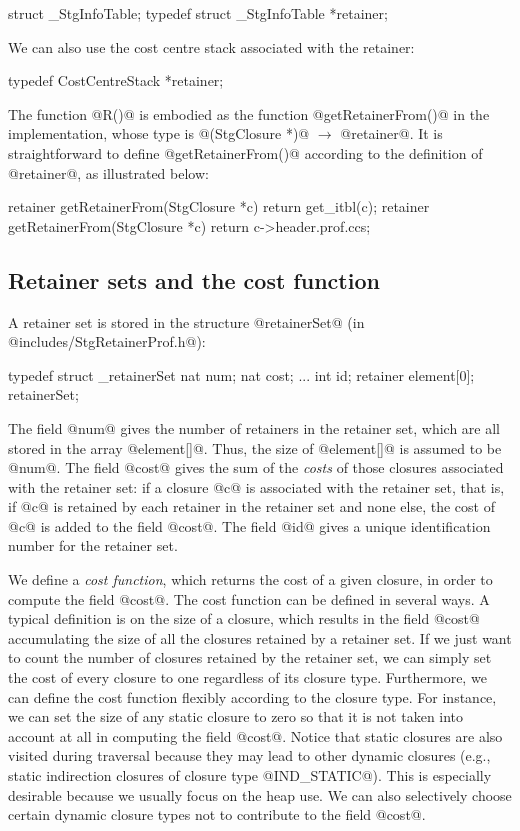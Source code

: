 \documentclass{article}
\begin{document}
\begin{code}
struct _StgInfoTable;
typedef struct _StgInfoTable *retainer;
\end{code}

We can also use the cost centre stack associated with the retainer:

\begin{code}
typedef CostCentreStack *retainer;
\end{code}

The function @R()@ is embodied as the function @getRetainerFrom()@ in the 
implementation, whose type is @(StgClosure *)@ $\rightarrow$ @retainer@.
It is straightforward to define @getRetainerFrom()@ according to the definition
of @retainer@, as illustrated below:

\begin{code}
retainer getRetainerFrom(StgClosure *c) { return get_itbl(c); }
retainer getRetainerFrom(StgClosure *c) { return c->header.prof.ccs; }
\end{code}

\subsection{Retainer sets and the cost function}

A retainer set is stored in the structure @retainerSet@ 
(in @includes/StgRetainerProf.h@):

\begin{code}
typedef struct _retainerSet {
  nat num;
  nat cost;
  ...
  int id;
  retainer element[0];
} retainerSet;
\end{code}

The field @num@ gives the number of retainers in the retainer set, which
are all stored in the array @element[]@. Thus, the size of @element[]@
is assumed to be @num@.
The field @cost@ gives the sum of the \emph{costs} of those closures 
associated with the retainer set: if a closure @c@ is
associated with the retainer set, that is, if @c@ is retained by each
retainer in the retainer set and none else,
the cost of @c@ is added to the field @cost@. 
The field @id@ gives a unique identification number for the retainer set.

We define a \emph{cost function}, which returns the cost of a given closure, 
in order to compute the field @cost@. 
The cost function can be defined in several ways.
A typical definition is on the size of a closure, which results in
the field @cost@ accumulating the size of all the closures retained by a
retainer set.
If we just want to count the number of closures retained by the
retainer set, we can simply set the cost of every closure to one regardless
of its closure type.
Furthermore, we can define the cost function flexibly according to
the closure type. 
For instance, we can set the size of any static closure to zero so that
it is not taken into account at all in computing the field @cost@. 
Notice that static closures are also visited during traversal because they 
may lead to other dynamic closures (e.g., static indirection closures of 
closure type @IND_STATIC@).
This is especially desirable because we usually focus on the heap use.
We can also selectively choose certain dynamic closure types not to contribute 
to the field @cost@.
\end{document}
